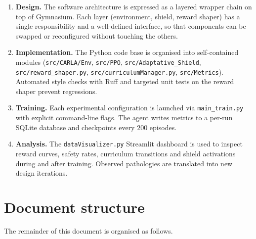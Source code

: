 \begin{enumerate}
  \item \textbf{Design.} The software architecture is expressed as a layered wrapper chain
        on top of Gymnasium. Each layer (environment, shield, reward shaper) has a single
        responsibility and a well-defined interface, so that components can be swapped or
        reconfigured without touching the others.
  \item \textbf{Implementation.} The Python code base is organised into self-contained modules
        (\texttt{src/CARLA/Env}, \texttt{src/PPO}, \texttt{src/Adaptative\_Shield},
        \texttt{src/reward\_shaper.py}, \texttt{src/curriculumManager.py}, \texttt{src/Metrics}).
        Automated style checks with Ruff and targeted unit tests on the reward shaper prevent
        regressions.
  \item \textbf{Training.} Each experimental configuration is launched via \texttt{main\_train.py}
        with explicit command-line flags. The agent writes metrics to a per-run SQLite database
        and checkpoints every $200$ episodes.
  \item \textbf{Analysis.} The \texttt{dataVisualizer.py} Streamlit dashboard is used to inspect
        reward curves, safety rates, curriculum transitions and shield activations during and
        after training. Observed pathologies are translated into new design iterations.
\end{enumerate}

\section{Document structure}\label{sec:intro-structure}

The remainder of this document is organised as follows.

